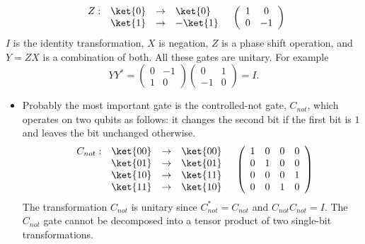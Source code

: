 \documentclass{slides}
\begin{document}
\begin{slide}{}
\begin{itemize}
$$\begin{array}{ll}
\begin{array}{lrcl}
Z:& \ket{0} & \to & \ket{0}\\
  & \ket{1} & \to & -\ket{1}\\
\end{array} &
\left(\begin{array}{cc}1 & 0\\ 0 & -1\end{array}\right)\\
\end{array}$$ 
$I$ is the identity transformation, $X$ is negation, $Z$ is
a phase shift operation, and $Y = ZX$ is a combination of both.  
All these gates are unitary.  For example
$$YY^* = \left(\begin{array}{cc}0 & -1\\ 1 & 0\end{array}\right) 
	 \left(\begin{array}{cc}0 & 1\\ -1 & 0\end{array}\right) = I.$$


\end{itemize}

\end{slide}

\begin{slide}{}

\begin{itemize}

\item Probably the most important gate is the controlled-{\sc not} gate, $C_{not}$, which
operates on two qubits as follows: it changes the second 
bit if the first bit is $1$ and leaves the bit unchanged otherwise.
$$\begin{array}{ll}\begin{array}{lrcl}
C_{not}:& \ket{00} & \to & \ket{00}\\
        & \ket{01} & \to & \ket{01}\\
        & \ket{10} & \to & \ket{11}\\
        & \ket{11} & \to & \ket{10}\\
\end{array} & \left(\begin{array}{cccc}1 & 0 & 0 & 0\\ 0 & 1 & 0 & 0\\
				       0 & 0 & 0 & 1\\ 0 & 0 & 1 & 0\end{array}\right)\\
\end{array}$$
The transformation $C_{not}$ is unitary since $C_{not}^*=C_{not}$ and
$C_{not}C_{not}= I$. 
The $C_{not}$ gate cannot
be decomposed into a tensor product of two 
single-bit transformations.

\end{itemize}

\end{slide}
\end{document}
